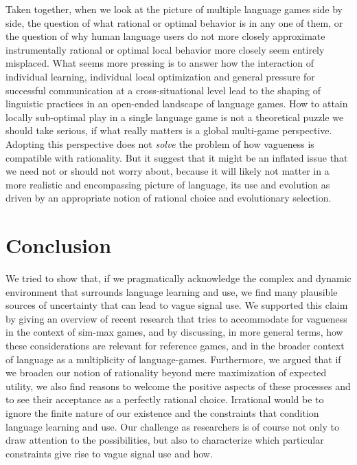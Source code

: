 \documentclass[a4paper]{article}
\begin{document}
Taken together, when we look at the picture of multiple language games side by side, the question of what rational or optimal behavior is in any one of them, or the question of why human language users do not more closely approximate instrumentally rational or optimal local behavior more closely seem entirely misplaced.
What seems more pressing is to answer how the interaction of individual learning, individual local optimization and general pressure for successful communication at a cross-situational level lead to the shaping of linguistic practices in an open-ended landscape of language games.
How to attain locally sub-optimal play in a single language game is not a theoretical puzzle we should take serious, if what really matters is a global multi-game perspective.
Adopting this perspective does not \emph{solve} the problem of how vagueness is compatible with rationality. 
But it suggest that it might be an inflated issue that we need not or should not worry about, because it will likely not matter in a more realistic and encompassing picture of language, its use and evolution as driven by an appropriate notion of rational choice and evolutionary selection.


\section{Conclusion}
\label{sec:conclusion}

We tried to show that, if we pragmatically acknowledge the complex and dynamic environment that surrounds language learning and use, we find many plausible sources of uncertainty that can lead to vague signal use.
We supported this claim by giving an overview of recent research that tries to accommodate for vagueness in the context of sim-max games, and by discussing, in more general terms, how these considerations are relevant for reference games, and in the broader context of language as a multiplicity of language-games.
Furthermore, we argued that if we broaden our notion of rationality beyond mere maximization of expected utility, we also find reasons to welcome the positive aspects of these processes and to see their acceptance as a perfectly rational choice.
Irrational would be to ignore the finite nature of our existence and the constraints that condition language learning and use.
Our challenge as researchers is of course not only to draw attention to the possibilities, but also to characterize which particular constraints give rise to vague signal use and how.
\end{document}
